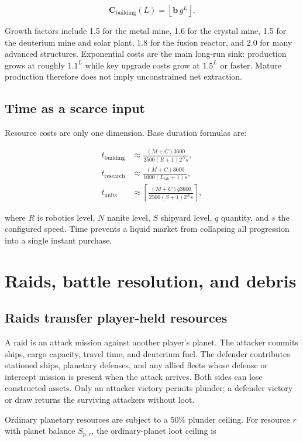 \documentclass[11pt]{article}
\begin{document}
\[
\mathbf{C}_{\mathrm{building}}(L)=\left\lfloor \mathbf{b}\,g^L\right\rfloor.
\]

Growth factors include 1.5 for the metal mine, 1.6 for the crystal mine, 1.5 for the deuterium mine and solar plant, 1.8 for the fusion reactor, and 2.0 for many advanced structures. Exponential costs are the main long-run sink: production grows at roughly $1.1^L$ while key upgrade costs grow at $1.5^L$ or faster. Mature production therefore does not imply unconstrained net extraction.

\subsection{Time as a scarce input}

Resource costs are only one dimension. Base duration formulas are:

\begin{align}
t_{\mathrm{building}} &\approx \frac{(M+C)3600}{2500(R+1)2^N s},\\
t_{\mathrm{research}} &\approx \frac{(M+C)3600}{1000(L_{\mathrm{lab}}+1)s},\\
t_{\mathrm{units}} &\approx \left\lceil\frac{(M+C)q3600}{2500(S+1)2^N s}\right\rceil,
\end{align}

where $R$ is robotics level, $N$ nanite level, $S$ shipyard level, $q$ quantity, and $s$ the configured speed. Time prevents a liquid market from collapsing all progression into a single instant purchase.

\section{Raids, battle resolution, and debris}

\subsection{Raids transfer player-held resources}

A raid is an attack mission against another player's planet. The attacker commits ships, cargo capacity, travel time, and deuterium fuel. The defender contributes stationed ships, planetary defenses, and any allied fleets whose defense or intercept mission is present when the attack arrives. Both sides can lose constructed assets. Only an attacker victory permits plunder; a defender victory or draw returns the surviving attackers without loot.

Ordinary planetary resources are subject to a 50\% plunder ceiling. For resource $r$ with planet balance $S_{p,r}$, the ordinary-planet loot ceiling is
\end{document}
